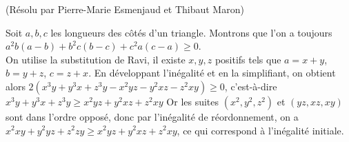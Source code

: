 \begin{sol}[69](Résolu par Pierre-Marie Esmenjaud et Thibaut Maron)

Soit $a,b,c$ les longueurs des côtés d'un triangle. Montrons que l'on a toujours $a^2b(a-b)+b^2c(b-c)+c^2a(c-a) \geq 0$.\\
On utilise la substitution de Ravi, il existe $x,y,z$ positifs tels que 
$a=x+y$,$b=y+z$, $c=z+x$.
En développant l'inégalité et en la simplifiant, on obtient alors
$2(x^3y+y^3x+z^3y-x^2yz-y^2xz-z^2xy) \geq 0$,
c'est-\`a-dire $x^3y+y^3x+z^3y \geq x^2yz+y^2xz+z^2xy$
Or les suites $(x^2,y^2,z^2)$ et $(yz,xz,xy)$ sont dans l'ordre opposé, donc par l'in\'egalit\'e de r\'eordonnement,
on a $x^2xy+y^2yz+z^2zy \geq x^2yz+y^2xz+z^2xy$, ce qui correspond \`a l'in\'egalit\'e initiale.

\end{sol}

